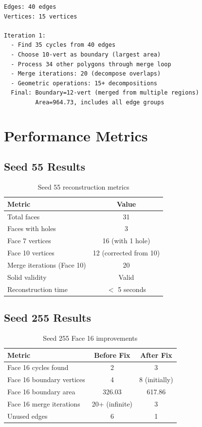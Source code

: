 \documentclass[11pt]{article}
\begin{document}
\begin{lstlisting}[caption={Complex face with multiple overlapping polygons},label={lst:complex}]
Edges: 40 edges
Vertices: 15 vertices

Iteration 1:
  - Find 35 cycles from 40 edges
  - Choose 10-vert as boundary (largest area)
  - Process 34 other polygons through merge loop
  - Merge iterations: 20 (decompose overlaps)
  - Geometric operations: 15+ decompositions
  Final: Boundary=12-vert (merged from multiple regions)
         Area=964.73, includes all edge groups
\end{lstlisting}

\section{Performance Metrics}

\subsection{Seed 55 Results}

\begin{table}[h]
\centering
\begin{tabular}{|l|c|}
\hline
\textbf{Metric} & \textbf{Value} \\ \hline
Total faces & 31 \\ \hline
Faces with holes & 3 \\ \hline
Face 7 vertices & 16 (with 1 hole) \\ \hline
Face 10 vertices & 12 (corrected from 10) \\ \hline
Merge iterations (Face 10) & 20 \\ \hline
Solid validity & Valid \\ \hline
Reconstruction time & $<$ 5 seconds \\ \hline
\end{tabular}
\caption{Seed 55 reconstruction metrics}
\end{table}

\subsection{Seed 255 Results}

\begin{table}[h]
\centering
\begin{tabular}{|l|c|c|}
\hline
\textbf{Metric} & \textbf{Before Fix} & \textbf{After Fix} \\ \hline
Face 16 cycles found & 2 & 3 \\ \hline
Face 16 boundary vertices & 4 & 8 (initially) \\ \hline
Face 16 boundary area & 326.03 & 617.86 \\ \hline
Face 16 merge iterations & 20+ (infinite) & 3 \\ \hline
Unused edges & 6 & 1 \\ \hline
\end{tabular}
\caption{Seed 255 Face 16 improvements}
\end{table}
\end{document}
